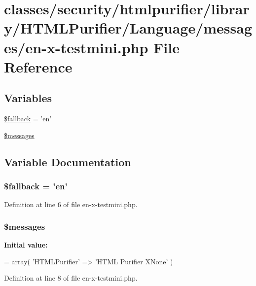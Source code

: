 \hypertarget{en-x-testmini_8php}{\section{classes/security/htmlpurifier/library/\+H\+T\+M\+L\+Purifier/\+Language/messages/en-\/x-\/testmini.php File Reference}
\label{en-x-testmini_8php}
}
\subsection*{Variables}
\begin{DoxyCompactItemize}
\item 
\hyperlink{en-x-testmini_8php_a0aa2d1acd291d3fedc1a3617d716e28e}{\$fallback} = 'en'
\item 
\hyperlink{en-x-testmini_8php_a21a183f927a6d243fe6b4ba3a6c4d4c8}{\$messages}
\end{DoxyCompactItemize}


\subsection{Variable Documentation}
\hypertarget{en-x-testmini_8php_a0aa2d1acd291d3fedc1a3617d716e28e}{
\subsubsection[{\$fallback}]{\setlength{\rightskip}{0pt plus 5cm}\$fallback = 'en'}}\label{en-x-testmini_8php_a0aa2d1acd291d3fedc1a3617d716e28e}


Definition at line 6 of file en-\/x-\/testmini.\+php.

\hypertarget{en-x-testmini_8php_a21a183f927a6d243fe6b4ba3a6c4d4c8}{
\subsubsection[{\$messages}]{\setlength{\rightskip}{0pt plus 5cm}\$messages}}\label{en-x-testmini_8php_a21a183f927a6d243fe6b4ba3a6c4d4c8}
{\bfseries Initial value\+:}
\begin{DoxyCode}
= array(
    \textcolor{stringliteral}{'HTMLPurifier'} => \textcolor{stringliteral}{'HTML Purifier XNone'}
)
\end{DoxyCode}


Definition at line 8 of file en-\/x-\/testmini.\+php.

